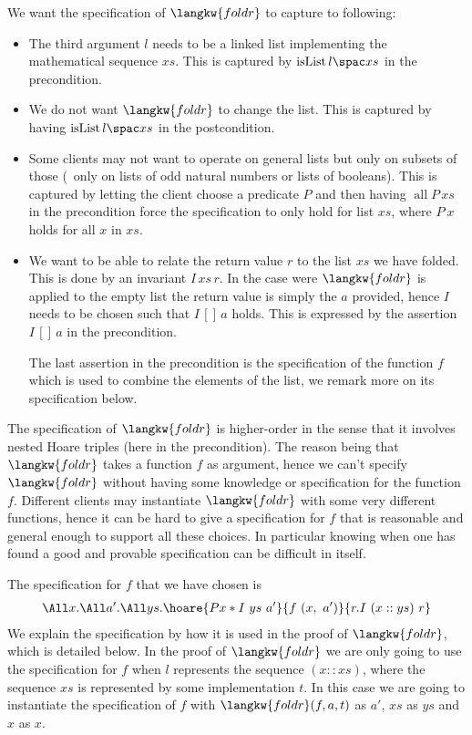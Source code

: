 We want the specification of $\langkw{foldr}$ to capture to following:
\begin{itemize}
\item The third argument $l$ needs to be a linked list implementing the mathematical sequence $xs$.
  This is captured by $\isList {l} {xs}$ in the precondition.
\item We do not want $\langkw{foldr}$ to change the list.
  This is captured by having $\isList {l} {xs}$ in the postcondition.
\item Some clients may not want to operate on general lists but only on subsets of those (\eg{}~only on lists of odd natural numbers or lists of booleans).
  This is captured by letting the client choose a predicate $P$ and then having $\operatorname{all} P\, xs$ in the precondition force the specification to only hold for list $xs$, where $P \ x$ holds for all $x$ in $xs$.
\item We want to be able to relate the return value $r$ to the list $xs$ we have folded.
  This is done by an invariant $I\, xs\, r$.
  In the case were $\langkw{foldr}$ is applied to the empty list the return value is simply the $a$ provided, hence $I$ needs to be chosen such that $I \, [] \, a$ holds.
  This is expressed by the assertion $I\, []\, a$ in the precondition.

  The last assertion in the precondition is the specification of the function $f$ which is used to combine the elements of the list, we remark more on its specification below.
\end{itemize}
The specification of $\langkw{foldr}$ is higher-order in the sense that it involves nested Hoare triples (here in the precondition).
The reason being that $\langkw{foldr}$ takes a function $f$ as argument, hence we can't specify $\langkw{foldr}$ without having some knowledge or specification for the function $f$.
Different clients may instantiate $\langkw{foldr}$ with some very different functions, hence it can be hard to give a specification for $f$ that is reasonable and general enough to support all these choices.
In particular knowing when one has found a good and provable specification can be difficult in itself.

The specification for $f$ that we have chosen is
\begin{align*}
\All x. \All a'. \All ys. \hoare{P x \ast I \ ys \ a'}{f \ (x, \ a')}{r. I\ (x::ys)\   r}
\end{align*}
We explain the specification by how it is used in the proof of $\langkw{foldr}$, which is detailed below.
In the proof of $\langkw{foldr}$ we are only going to use the specification for $f$ when $l$ represents the sequence $(x::xs)$, where the sequence $xs$ is represented by some implementation $t$.
In this case we are going to instantiate the specification of $f$ with $\langkw{foldr}(f, a, t)$ as $a'$, $xs$ as $ys$ and $x$ as $x$.

